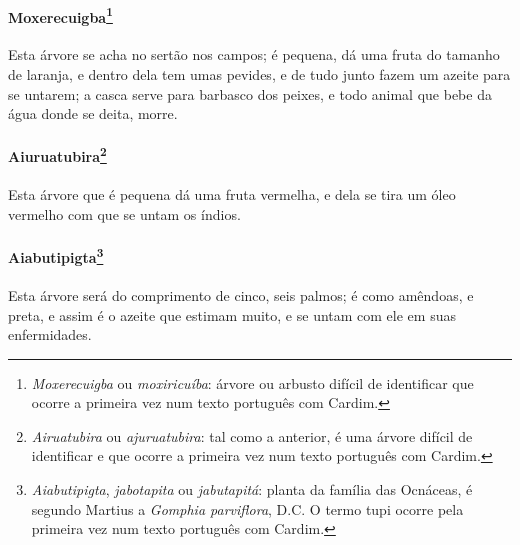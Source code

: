 \paragraph{Moxerecuigba\footnote{ \textit{Moxerecuigba} ou
\textit{moxiricuíba}: árvore ou arbusto difícil de identificar que
ocorre a primeira vez num texto português com Cardim.}} Esta árvore se
acha no sertão nos campos; é pequena, dá uma fruta do tamanho de
laranja, e dentro dela tem umas pevides, e de tudo junto fazem um
azeite para se untarem; a casca serve para barbasco dos peixes, e todo
animal que bebe da água donde se deita, morre. 

\paragraph{Aiuruatubira\footnote{ \textit{Airuatubira} ou
\textit{ajuruatubira}: tal como a anterior, é uma árvore difícil de
identificar e que ocorre a primeira vez num texto português com
Cardim.}} Esta árvore que é pequena dá uma fruta vermelha, e
dela se tira um óleo vermelho com que se untam os índios. 

\paragraph{Aiabutipigta\footnote{ \textit{Aiabutipigta}, 
\textit{jabotapita} ou \textit{jabutapitá}: planta da família das
Ocnáceas, é segundo Martius a \textit{Gomphia parviflora}, D.C. O
termo tupi ocorre pela primeira vez num texto português com
Cardim.}} Esta árvore será do comprimento de cinco, seis
palmos; é como amêndoas, e preta, e assim é o azeite que estimam muito,
e se untam com ele em suas enfermidades.

